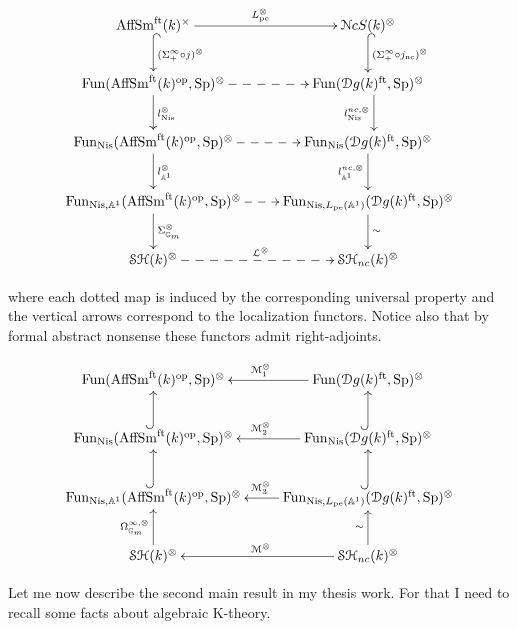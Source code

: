 \begin{refsection}
\begin{equation}
\label{diagramaleft}
\xymatrix{
\aff^{\times}\ar@{^{(}->}[d]^{(\Sigma^{\infty}_{+}\circ j)^{\otimes}}\ar[r]^{L_\mathrm{pe}^{\otimes}}& \nck^{\otimes}\ar@{^{(}->}[d]^{(\Sigma^{\infty}_{+}\circ j_{\mathrm{nc}})^{\otimes}}\\
\mathrm{Fun}(\aff^\mathrm{op}, \Sp)^{\otimes}\ar[d]^{l_\mathrm{Nis}^{\otimes}}\ar@{-->}[r]& \mathrm{Fun}(\mathcal{D}g(k)^\mathrm{ft}, \Sp)^{\otimes}\ar@<1ex>[d]_{l_\mathrm{Nis}^{nc, \otimes}}\\
\mathrm{Fun}_\mathrm{Nis}(\aff^\mathrm{op}, \Sp)^{\otimes}  \ar[d]^{l_{\mathbb{A}^1}^{\otimes}}\ar@{-->}[r]& \mathrm{Fun}_\mathrm{Nis}(\mathcal{D}g(k)^\mathrm{ft}, \Sp)^{\otimes}\ar[d]_{l_{\mathbb{A}^1}^{nc,\otimes}} \\
\mathrm{Fun}_{\mathrm{Nis}, \mathbb{A}^1}(\aff^\mathrm{op}, \Sp)^{\otimes}  \ar[d]^{\Sigma_{\mathbb{G}_m}^{\otimes}}\ar@{-->}[r]& \mathrm{Fun}_{\mathrm{Nis}, L_\mathrm{pe}(\mathbb{A}^1)}(\mathcal{D}g(k)^\mathrm{ft}, \Sp)^{\otimes}\ar[d]^{\sim} \\
\stmonoidalk\ar@{-->}[r]^{\mathcal{L}^{\otimes}}&\stncmonoidalk
}
\end{equation}

\noindent where each dotted map is induced by the corresponding universal property and the vertical arrows correspond to the localization functors. Notice also that by formal abstract nonsense these functors admit right-adjoints.


\begin{equation}
\label{diagramaright}
\xymatrix{
\mathrm{Fun}(\aff^\mathrm{op}, \Sp)^{\otimes}& \ar[l]_{\M_1^{\otimes}} \mathrm{Fun}(\mathcal{D}g(k)^\mathrm{ft}, \Sp)^{\otimes}\\
\ar@{^{(}->}[u]  \mathrm{Fun}_\mathrm{Nis}(\aff^\mathrm{op}, \Sp)^{\otimes}  & \ar@{^{(}->}[u] \ar[l]_{\M_2^{\otimes}} \mathrm{Fun}_\mathrm{Nis}(\mathcal{D}g(k)^\mathrm{ft}, \Sp)^{\otimes}\\
\ar@{^{(}->}[u]  \mathrm{Fun}_{\mathrm{Nis}, \mathbb{A}^1}(\aff^\mathrm{op}, \Sp)^{\otimes} & \ar@{^{(}->}[u] \ar[l]_{\M_3^{\otimes}} \mathrm{Fun}_{\mathrm{Nis}, L_\mathrm{pe}(\mathbb{A}^1)}(\mathcal{D}g(k)^\mathrm{ft}, \Sp)^{\otimes} \\
\stmonoidalk \ar[u]^{\Omega^{\infty,\otimes}_{\mathbb{G}_m}}& \ar[l]_{\M^{\otimes}}\stncmonoidalk \ar[u]^{\sim}
}
\end{equation}

Let me now describe the second main result in my thesis work. For that I need to recall some facts about algebraic K-theory. \\


\end{refsection}

